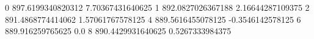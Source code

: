 0 897.6199340820312 7.70367431640625
1 892.0827026367188 2.16644287109375
2 891.4868774414062 1.57061767578125
4 889.5616455078125 -0.3546142578125
6 889.916259765625 0.0
8 890.4429931640625 0.5267333984375
